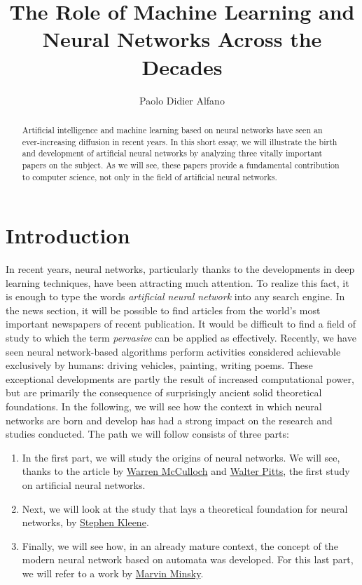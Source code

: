 \documentclass[10pt]{article}
\title{The Role of Machine Learning and Neural Networks Across the Decades}
\date{}
\author{Paolo Didier Alfano}
\affil{Università degli Studi di Torino}
\begin{document}
\maketitle
\begin{abstract}
Artificial intelligence and machine learning based on neural networks have seen an ever-increasing diffusion in recent years. In this short essay, we will illustrate the birth and development of artificial neural networks by analyzing three vitally important papers on the subject. As we will see, these papers provide a fundamental contribution to computer science, not only in the field of artificial neural networks.
\end{abstract}
\section{Introduction}
In recent years, neural networks, particularly thanks to the developments in deep learning techniques, have been attracting much attention. To realize this fact, it is enough to type the words \emph{artificial neural network} into any search engine. In the news section, it will be possible to find articles from the world's most important newspapers of recent publication. It would be difficult to find a field of study to which the term \emph{pervasive} can be applied as effectively. Recently, we have seen neural network-based algorithms perform activities considered achievable exclusively by humans: driving vehicles, painting, writing poems. These exceptional developments are partly the result of increased computational power, but are primarily the consequence of surprisingly ancient solid theoretical foundations. In the following, we will see how the context in which neural networks are born and develop has had a strong impact on the research and studies conducted. The path we will follow consists of three parts:
\begin{enumerate}
	\item In the first part, we will study the origins of neural networks. We will see, thanks to the article by \href{https://en.wikipedia.org/wiki/Warren_Sturgis_McCulloch}{Warren McCulloch} and \href{https://en.wikipedia.org/wiki/Walter_Pitts}{Walter Pitts}, the first study on artificial neural networks.
	\item Next, we will look at the study that lays a theoretical foundation for neural networks, by \href{https://en.wikipedia.org/wiki/Stephen_Cole_Kleene}{Stephen Kleene}.
	\item Finally, we will see how, in an already mature context, the concept of the modern neural network based on automata was developed. For this last part, we will refer to a work by \href{https://en.wikipedia.org/wiki/Marvin_Minsky}{Marvin Minsky}.
\end{enumerate}
\end{document}
